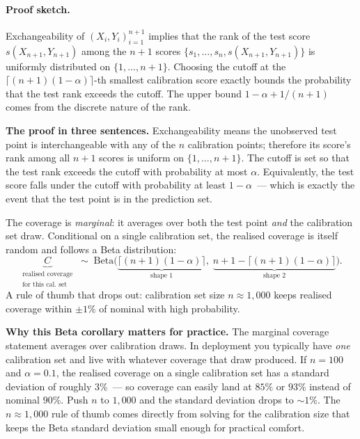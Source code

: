 \documentclass[letterpaper,11pt,leqno]{article}
\begin{document}
\paragraph{Proof sketch.} Exchangeability of $(X_i, Y_i)_{i=1}^{n+1}$ implies that the rank of the test score $s(X_{n+1}, Y_{n+1})$ among the $n+1$ scores $\{s_1, \dots, s_n, s(X_{n+1}, Y_{n+1})\}$ is uniformly distributed on $\{1, \dots, n+1\}$. Choosing the cutoff at the $\lceil (n+1)(1-\alpha)\rceil$-th smallest calibration score exactly bounds the probability that the test rank exceeds the cutoff. The upper bound $1 - \alpha + 1/(n+1)$ comes from the discrete nature of the rank.

\begin{explain}
\textbf{The proof in three sentences.} Exchangeability means the unobserved test point is interchangeable with any of the $n$ calibration points; therefore its score's rank among all $n+1$ scores is uniform on $\{1, \dots, n+1\}$. The cutoff is set so that the test rank exceeds the cutoff with probability at most $\alpha$. Equivalently, the test score falls under the cutoff with probability at least $1 - \alpha$~--- which is exactly the event that the test point is in the prediction set.
\end{explain}

The coverage is \emph{marginal}: it averages over both the test point \emph{and} the calibration set draw. Conditional on a single calibration set, the realised coverage is itself random and follows a Beta distribution:
\begin{equation*}
\underbrace{C}_{\substack{\text{realised coverage}\\\text{for this cal.\ set}}}
\;\sim\;
\text{Beta}\bigl(\underbrace{\lceil (n+1)(1-\alpha)\rceil}_{\text{shape 1}},\;\underbrace{n+1-\lceil (n+1)(1-\alpha)\rceil}_{\text{shape 2}}\bigr).
\end{equation*}
A rule of thumb that drops out: calibration set size $n \approx 1{,}000$ keeps realised coverage within $\pm 1\%$ of nominal with high probability.

\begin{whymatters}
\textbf{Why this Beta corollary matters for practice.} The marginal coverage statement averages over calibration draws. In deployment you typically have \emph{one} calibration set and live with whatever coverage that draw produced. If $n = 100$ and $\alpha = 0.1$, the realised coverage on a single calibration set has a standard deviation of roughly $3\%$~--- so coverage can easily land at $85\%$ or $93\%$ instead of nominal $90\%$. Push $n$ to $1{,}000$ and the standard deviation drops to ${\sim}1\%$. The $n \approx 1{,}000$ rule of thumb comes directly from solving for the calibration size that keeps the Beta standard deviation small enough for practical comfort.
\end{whymatters}
\end{document}

